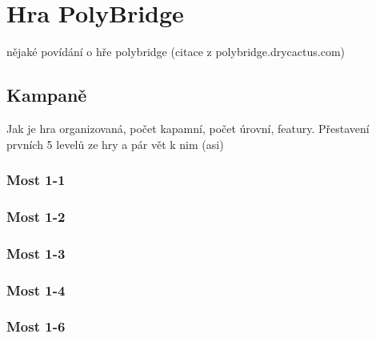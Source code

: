 \chapter{Hra PolyBridge}

nějaké povídání o hře polybridge (citace z polybridge.drycactus.com)

\section{Kampaně}
Jak je hra organizovaná, počet kapamní, počet úrovní, featury. Přestavení prvních 5 levelů ze hry a pár vět k nim (asi)
\subsection{Most 1-1}
\subsection{Most 1-2}
\subsection{Most 1-3}
\subsection{Most 1-4}
\subsection{Most 1-6}
